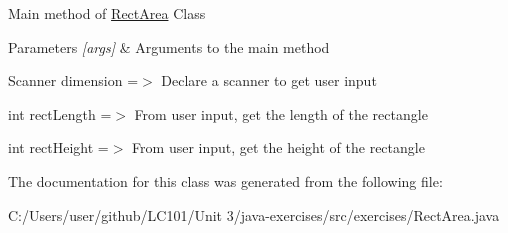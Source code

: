 Main method of \mbox{\hyperlink{classexercises_1_1_rect_area}{Rect\+Area}} Class 
\begin{DoxyParams}{Parameters}
{\em \mbox{[}args\mbox{]}} & Arguments to the main method \\
\hline
\end{DoxyParams}
Scanner dimension =$>$ Declare a scanner to get user input

int rect\+Length =$>$ From user input, get the length of the rectangle

int rect\+Height =$>$ From user input, get the height of the rectangle 

The documentation for this class was generated from the following file\+:\begin{DoxyCompactItemize}
\item 
C\+:/\+Users/user/github/\+L\+C101/\+Unit 3/java-\/exercises/src/exercises/Rect\+Area.\+java\end{DoxyCompactItemize}

